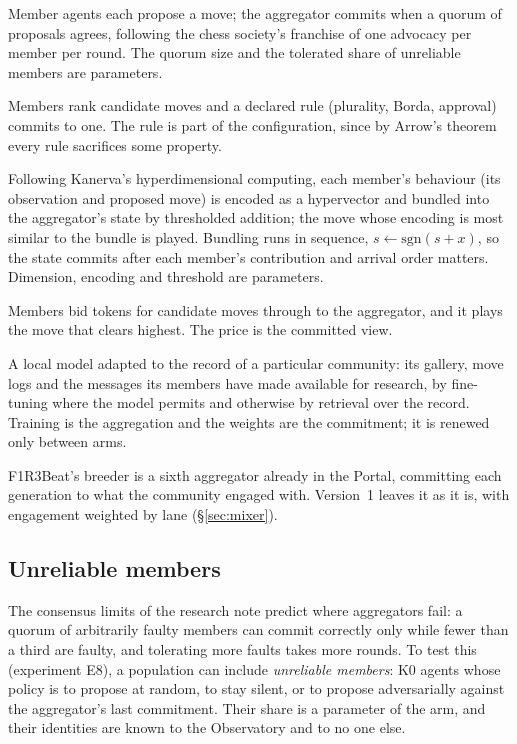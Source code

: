 \documentclass[11pt,a4paper]{article}
\begin{document}
\begin{description}[leftmargin=1.2em,itemsep=4pt,font=\normalfont\spartansemi]
\item[Quorum.] Member agents each propose a move; the aggregator commits when a quorum of proposals
  agrees, following the chess society's franchise of one advocacy per member per round. The quorum
  size and the tolerated share of unreliable members are parameters.
\item[Vote.] Members rank candidate moves and a declared rule (plurality, Borda, approval)
  commits to one. The rule is part of the configuration, since by Arrow's theorem every rule
  sacrifices some property.
\item[Bundle.] Following Kanerva's hyperdimensional computing, each member's behaviour (its
  observation and proposed move) is encoded as a hypervector and bundled into the aggregator's state
  by thresholded addition; the move whose encoding is most similar to the bundle is played. Bundling
  runs in sequence, $s \leftarrow \mathrm{sgn}(s+x)$, so the state commits after each member's
  contribution and arrival order matters. Dimension, encoding and threshold are parameters.
\item[Market.] Members bid tokens for candidate moves through  to the
  aggregator, and it plays the move that clears highest. The price is the committed view.
\item[Community model.] A local model adapted to the record of a particular community: its gallery,
  move logs and the messages its members have made available for research, by fine-tuning where the
  model permits and otherwise by retrieval over the record. Training is the aggregation and the
  weights are the commitment; it is renewed only between arms.
\end{description}

F1R3Beat's breeder is a sixth aggregator already in the Portal, committing each generation to what
the community engaged with. Version~1 leaves it as it is, with engagement weighted by lane
(\S\ref{sec:mixer}).

\subsection{Unreliable members}

The consensus limits of the research note predict where aggregators fail: a quorum of arbitrarily
faulty members can commit correctly only while fewer than a third are faulty, and tolerating more
faults takes more rounds. To test this (experiment E8), a population can include \emph{unreliable
members}: K0 agents whose policy is to propose at random, to stay silent, or to propose
adversarially against the aggregator's last commitment. Their share is a parameter of the arm, and
their identities are known to the Observatory and to no one else.
\end{document}
